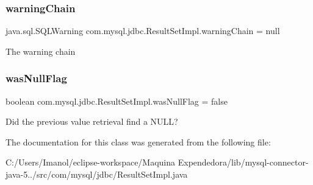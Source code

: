 \subsubsection{\texorpdfstring{warning\+Chain}{warningChain}}
{\footnotesize\ttfamily java.\+sql.\+S\+Q\+L\+Warning com.\+mysql.\+jdbc.\+Result\+Set\+Impl.\+warning\+Chain = null\hspace{0.3cm}{\ttfamily [protected]}}

The warning chain \mbox{\label{classcom_1_1mysql_1_1jdbc_1_1_result_set_impl_ad745afd943c6121eb849bdd3769f5049}} 
\subsubsection{\texorpdfstring{was\+Null\+Flag}{wasNullFlag}}
{\footnotesize\ttfamily boolean com.\+mysql.\+jdbc.\+Result\+Set\+Impl.\+was\+Null\+Flag = false\hspace{0.3cm}{\ttfamily [protected]}}

Did the previous value retrieval find a N\+U\+LL? 

The documentation for this class was generated from the following file\+:\begin{DoxyCompactItemize}
\item 
C\+:/\+Users/\+Imanol/eclipse-\/workspace/\+Maquina Expendedora/lib/mysql-\/connector-\/java-\/5../src/com/mysql/jdbc/Result\+Set\+Impl.\+java\end{DoxyCompactItemize}
